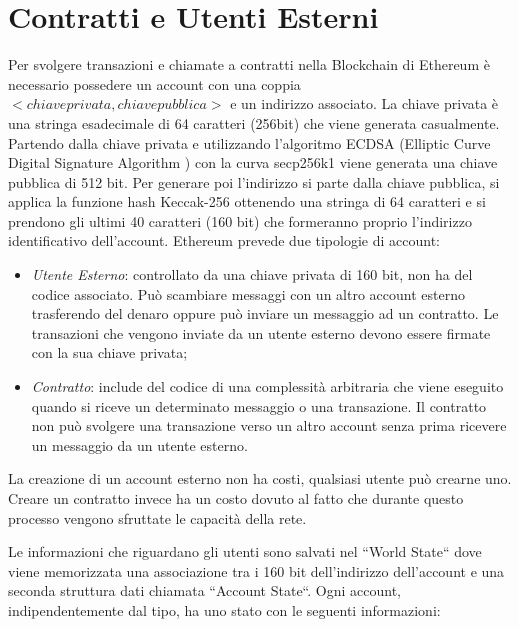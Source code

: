\documentclass[12pt]{report}
\begin{document}
\section{Contratti e Utenti Esterni}
Per svolgere transazioni e chiamate a contratti nella Blockchain di Ethereum è necessario possedere un account con una coppia $<chiave privata, chiave pubblica>$ e un indirizzo associato.
La chiave privata è una stringa esadecimale di 64 caratteri (256bit) che viene generata casualmente. Partendo dalla chiave privata e utilizzando l'algoritmo ECDSA (Elliptic Curve Digital Signature Algorithm ) con la curva secp256k1 viene generata una chiave pubblica di 512 bit.
Per generare poi l'indirizzo si parte dalla chiave pubblica, si applica la funzione hash Keccak-256 ottenendo una stringa di 64 caratteri e si prendono gli ultimi 40 caratteri (160 bit) che formeranno proprio l'indirizzo identificativo dell'account.
Ethereum prevede due tipologie di account:

\begin{itemize}
\item \textit{Utente Esterno}: controllato da una chiave privata di 160 bit, non ha del codice associato. Può scambiare messaggi con un altro account esterno trasferendo del denaro oppure può inviare un messaggio ad un contratto. Le transazioni che vengono inviate da un utente esterno devono essere firmate con la sua chiave privata;
\item \textit{Contratto}: include del codice di una complessità arbitraria che viene eseguito quando si riceve un determinato messaggio o una transazione.
Il contratto non può svolgere una transazione verso un altro account senza prima ricevere un messaggio da un utente esterno.
\end{itemize}

La creazione di un account esterno non ha costi, qualsiasi utente può crearne uno.
Creare un contratto invece ha un costo dovuto al fatto che durante questo processo vengono sfruttate le capacità della rete.

Le informazioni che riguardano gli utenti sono salvati nel ``World State`` dove viene memorizzata una associazione tra i 160 bit dell'indirizzo dell'account e una seconda struttura dati chiamata ``Account State``.
Ogni account, indipendentemente dal tipo, ha uno stato con le seguenti informazioni:
\end{document}
